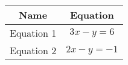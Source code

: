 \begin{tabular}{|c|c|}
\hline
\textbf{Name} & \textbf{Equation} \\
\hline
Equation 1 & $3x - y = 6$ \\ \hline
Equation 2 & $2x - y = -1$ \\ \hline
\end{tabular}
